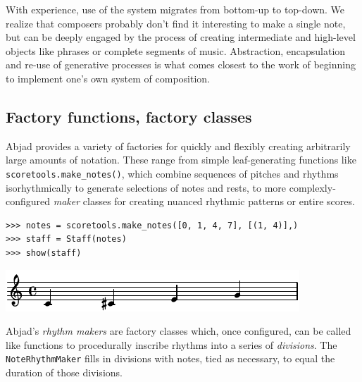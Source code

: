 \documentclass{article}
\begin{document}
With experience, use of the system migrates from bottom-up to top-down. We
realize that composers probably don't find it interesting to make a single
note, but can be deeply engaged by the process of creating intermediate and
high-level objects like phrases or complete segments of music. Abstraction,
encapsulation and re-use of generative processes is what comes closest to the
work of beginning to implement one's own system of composition.

\subsection{Factory functions, factory classes}

Abjad provides a variety of factories for quickly and flexibly creating
arbitrarily large amounts of notation. These range from simple leaf-generating
functions like \texttt{scoretools.make\_notes()}, which combine sequences of
pitches and rhythms isorhythmically to generate selections of notes and rests,
to more complexly-configured \emph{maker} classes for creating nuanced rhythmic
patterns or entire scores.

\begin{lstlisting}
>>> notes = scoretools.make_notes([0, 1, 4, 7], [(1, 4)],)
>>> staff = Staff(notes)
>>> show(staff)
\end{lstlisting}
\includegraphics{assets/lilypond-64155bcaa384109d40ae2616a2224dd1.pdf}

Abjad's \emph{rhythm makers} are factory classes which, once configured, can be
called like functions to procedurally inscribe rhythms into a series of
\emph{divisions}. The \texttt{NoteRhythmMaker} fills in divisions with notes,
tied as necessary, to equal the duration of those divisions.

\end{document}
